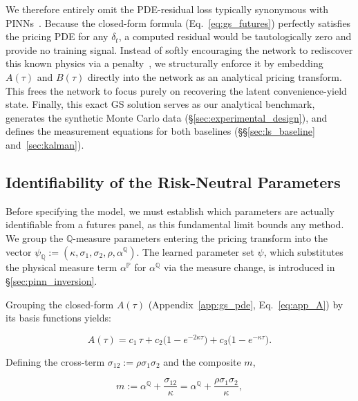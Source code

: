 \documentclass[sigconf, authorversion=true, nonacm=true]{acmart}
\newcommand{\convyield}{\delta}             %
\newcommand{\meanrev}{\kappa}               %
\newcommand{\longrun}{\alpha}               %
\begin{document}
We therefore entirely omit the PDE-residual loss typically synonymous with PINNs~\cite{Raissi2019Physics-informedEquations}. Because the closed-form formula (Eq.~\ref{eq:gs_futures}) perfectly satisfies the pricing PDE for any $\convyield_t$, a computed residual would be tautologically zero and provide no training signal. Instead of softly encouraging the network to rediscover this known physics via a penalty~\cite{Raissi2019Physics-informedEquations, Hoshisashi2024Physics-InformedPDEs}, we structurally enforce it by embedding $A(\tau)$ and $B(\tau)$ directly into the network as an analytical pricing transform. This frees the network to focus purely on recovering the latent convenience-yield state. Finally, this exact GS solution serves as our analytical benchmark, generates the synthetic Monte Carlo data (\S\ref{sec:experimental_design}), and defines the measurement equations for both baselines (\S\S\ref{sec:ls_baseline} and~\ref{sec:kalman}).

\subsection{Identifiability of the Risk-Neutral Parameters}
\label{sec:identifiability}
Before specifying the model, we must establish which parameters are actually identifiable from a futures panel, as this fundamental limit bounds any method. We group the $\mathbb{Q}$-measure parameters entering the pricing transform into the vector $\psi_{\mathbb{Q}} := (\meanrev, \sigma_1, \sigma_2, \rho, \longrun^{\mathbb{Q}})$. The learned parameter set $\psi$, which substitutes the physical measure term $\alpha^{\mathbb{P}}$ for $\alpha^{\mathbb{Q}}$ via the measure change, is introduced in \S\ref{sec:pinn_inversion}.

Grouping the closed-form $A(\tau)$ (Appendix~\ref{app:gs_pde}, Eq.~\ref{eq:app_A}) by its basis functions yields:

\begin{equation}
  \label{eq:A_basis}
  A(\tau) = c_1\,\tau
          + c_2\big(1 - e^{-2\meanrev\tau}\big)
          + c_3\big(1 - e^{-\meanrev\tau}\big).
\end{equation}

Defining the cross-term $\sigma_{12} := \rho\sigma_1\sigma_2$ and the composite $m$,

\begin{equation}
  \label{eq:identified_composite}
  m := \longrun^{\mathbb{Q}} + \frac{\sigma_{12}}{\meanrev}
     = \longrun^{\mathbb{Q}} + \frac{\rho\sigma_1\sigma_2}{\meanrev},
\end{equation}
\end{document}
